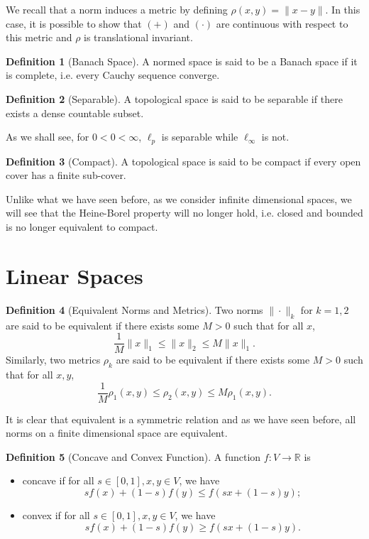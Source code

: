 \documentclass[]{article}
\theoremstyle{definition}
\theoremstyle{definition}
\newtheorem{definition}{Definition}[section]
\begin{document}
We recall that a norm induces a metric by defining \(\rho(x, y) = \|x - y\|\). 
In this case, it is possible to show that \((+)\) and \((\cdot)\) are 
continuous with respect to this metric and \(\rho\) is translational invariant. 

\begin{definition}[Banach Space]
  A normed space is said to be a Banach space if it is complete, i.e. every 
  Cauchy sequence converge. 
\end{definition}

\begin{definition}[Separable]
  A topological space is said to be separable if there exists a dense 
  countable subset.
\end{definition}

As we shall see, for \(0 < 0 < \infty\), \(\ell_p\) is separable while 
\(\ell_\infty\) is not.

\begin{definition}[Compact]
  A topological space is said to be compact if every open cover has a finite 
  sub-cover. 
\end{definition}

Unlike what we have seen before, as we consider infinite dimensional spaces, 
we will see that the Heine-Borel property will no longer hold, i.e.
closed and bounded is no longer equivalent to compact.

\newpage

\section{Linear Spaces}

\begin{definition}[Equivalent Norms and Metrics]
  Two norms \(\|\cdot\|_k\) for \(k = 1, 2\) are said to be equivalent if there 
  exists some \(M > 0\) such that for all \(x\), 
  \[\frac{1}{M} \|x\|_1 \le \|x\|_2 \le M \|x\|_1.\]
  Similarly, two metrics \(\rho_k\) are said to be equivalent if there exists
  some \(M > 0\) such that for all \(x, y\), 
  \[\frac{1}{M} \rho_1(x, y) \le \rho_2(x, y) \le M \rho_1(x, y).\]
\end{definition}

It is clear that equivalent is a symmetric relation and as we have seen before,
all norms on a finite dimensional space are equivalent.

\begin{definition}[Concave and Convex Function]
  A function \(f : V \to \mathbb{R}\) is 
  \begin{itemize}
    \item concave if for all \(s \in [0, 1], x, y \in V\), we have  
      \[sf(x) + (1 - s)f(y) \le f(sx + (1 - s)y);\]
    \item convex if for all \(s \in [0, 1], x, y \in V\), we have  
      \[sf(x) + (1 - s)f(y) \ge f(sx + (1 - s)y).\] 
  \end{itemize}
\end{definition}
\end{document}
